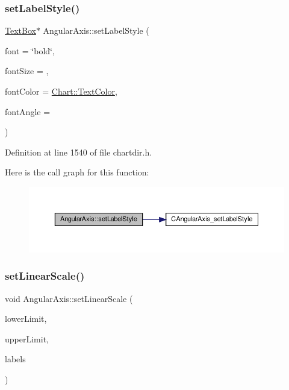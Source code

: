 \subsubsection{\texorpdfstring{set\+Label\+Style()}{setLabelStyle()}}
{\footnotesize\ttfamily \hyperlink{class_text_box}{Text\+Box}$\ast$ Angular\+Axis\+::set\+Label\+Style (\begin{DoxyParamCaption}\item[{const char $\ast$}]{font = {\ttfamily \char`\"{}bold\char`\"{}},  }\item[{double}]{font\+Size = {},  }\item[{int}]{font\+Color = {\ttfamily \hyperlink{namespace_chart_abee0d882fdc9ad0b001245ad9fc64011a879e14f2f5024caccc047374342321ef}{Chart\+::\+Text\+Color}},  }\item[{double}]{font\+Angle = {} }\end{DoxyParamCaption})\hspace{0.3cm}{\ttfamily [inline]}}



Definition at line 1540 of file chartdir.\+h.

Here is the call graph for this function\+:
\nopagebreak
\begin{figure}[H]
\begin{center}
\leavevmode
\includegraphics[width=350pt]{class_angular_axis_a7cdca2dfe1200fdf2664d269dac585ba_cgraph}
\end{center}
\end{figure}
\mbox{\label{class_angular_axis_a11fd9c97d2d76f01cec095a10edbe500}} 
\subsubsection{\texorpdfstring{set\+Linear\+Scale()}{setLinearScale()}\hspace{0.1cm}{\footnotesize\ttfamily [1/2]}}
{\footnotesize\ttfamily void Angular\+Axis\+::set\+Linear\+Scale (\begin{DoxyParamCaption}\item[{double}]{lower\+Limit,  }\item[{double}]{upper\+Limit,  }\item[{\hyperlink{class_string_array}{String\+Array}}]{labels }\end{DoxyParamCaption})\hspace{0.3cm}{\ttfamily [inline]}}



